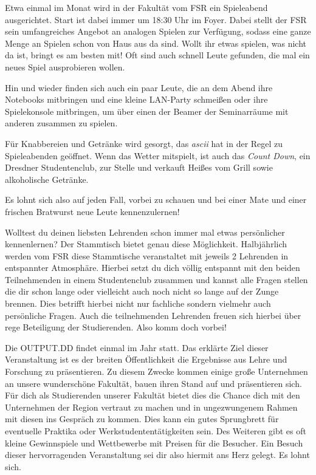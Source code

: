 

Etwa einmal im Monat wird in der Fakultät vom FSR ein Spieleabend ausgerichtet. Start ist dabei immer um 18:30 Uhr im Foyer. Dabei stellt der FSR sein umfangreiches Angebot an analogen Spielen zur Verfügung, sodass eine ganze Menge an Spielen schon von Haus aus da sind. Wollt ihr etwas spielen, was nicht da ist, bringt es am besten mit! Oft sind auch schnell Leute gefunden, die mal ein neues Spiel ausprobieren wollen.

Hin und wieder finden sich auch ein paar Leute, die an dem Abend ihre Notebooks mitbringen und eine kleine LAN-Party schmeißen oder ihre Spielekonsole mitbringen, um über einen der Beamer der Seminarräume mit anderen zusammen zu spielen.

Für Knabbereien und Getränke wird gesorgt, das \emph{ascii} hat in der Regel zu Spieleabenden geöffnet. Wenn das Wetter mitspielt, ist auch das \emph{Count Down}, ein Dresdner Studentenclub, zur Stelle und verkauft Heißes vom Grill sowie alkoholische Getränke.

Es lohnt sich also auf jeden Fall, vorbei zu schauen und bei einer Mate und einer frischen Bratwurst neue Leute kennenzulernen!


Wolltest du deinen liebsten Lehrenden schon immer mal etwas persönlicher kennenlernen? Der Stammtisch bietet genau diese Möglichkeit. Halbjährlich werden vom FSR diese Stammtische veranstaltet mit jeweils 2 Lehrenden in entspannter Atmosphäre. Hierbei setzt du dich völlig entspannt mit den beiden Teilnehmenden in einem Studentenclub zusammen und kannst alle Fragen stellen die dir schon lange oder vielleicht auch noch nicht so lange auf der Zunge brennen. Dies betrifft hierbei nicht nur fachliche sondern vielmehr auch persönliche Fragen. Auch die teilnehmenden Lehrenden freuen sich hierbei über rege Beteiligung der Studierenden. Also komm doch vorbei!


Die OUTPUT.DD findet einmal im Jahr statt. Das erklärte Ziel dieser Veranstaltung ist es der breiten Öffentlichkeit die Ergebnisse aus Lehre und Forschung zu präsentieren. Zu diesem Zwecke kommen einige große Unternehmen an unsere wunderschöne Fakultät, bauen ihren Stand auf und präsentieren sich. Für dich als Studierenden unserer Fakultät bietet dies die Chance dich mit den Unternehmen der Region vertraut zu machen und in ungezwungenem Rahmen mit diesen ins Gespräch zu kommen. Dies kann ein gutes Sprungbrett für eventuelle Praktika oder Werkstudententätigkeiten sein. Des Weiteren gibt es oft kleine Gewinnspiele und Wettbewerbe mit Preisen für die Besucher. Ein Besuch dieser hervorragenden Veranstaltung sei dir also hiermit ans Herz gelegt. Es lohnt sich.

